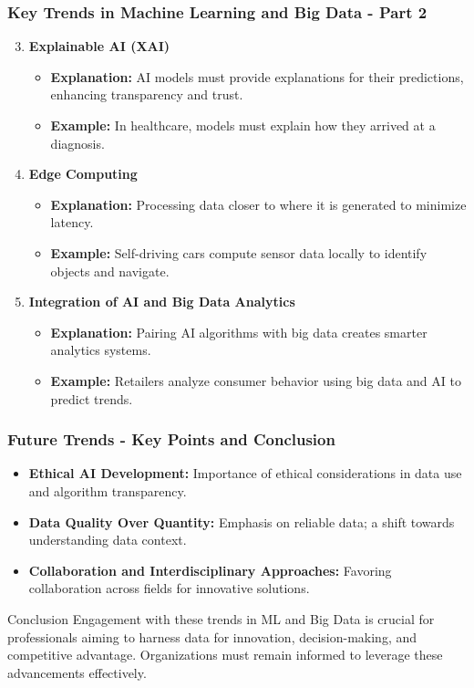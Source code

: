 \documentclass[aspectratio=169]{beamer}
\begin{document}
\begin{frame}[fragile]
    \frametitle{Key Trends in Machine Learning and Big Data - Part 2}
    \begin{enumerate}
        \setcounter{enumi}{2}
        \item \textbf{Explainable AI (XAI)}
            \begin{itemize}
                \item \textbf{Explanation:} AI models must provide explanations for their predictions, enhancing transparency and trust.
                \item \textbf{Example:} In healthcare, models must explain how they arrived at a diagnosis.
            \end{itemize}
        
        \item \textbf{Edge Computing}
            \begin{itemize}
                \item \textbf{Explanation:} Processing data closer to where it is generated to minimize latency.
                \item \textbf{Example:} Self-driving cars compute sensor data locally to identify objects and navigate.
            \end{itemize}

        \item \textbf{Integration of AI and Big Data Analytics}
            \begin{itemize}
                \item \textbf{Explanation:} Pairing AI algorithms with big data creates smarter analytics systems.
                \item \textbf{Example:} Retailers analyze consumer behavior using big data and AI to predict trends.
            \end{itemize}
    \end{enumerate}
\end{frame}

\begin{frame}[fragile]
    \frametitle{Future Trends - Key Points and Conclusion}
    \begin{itemize}
        \item \textbf{Ethical AI Development:} Importance of ethical considerations in data use and algorithm transparency.
        \item \textbf{Data Quality Over Quantity:} Emphasis on reliable data; a shift towards understanding data context.
        \item \textbf{Collaboration and Interdisciplinary Approaches:} Favoring collaboration across fields for innovative solutions.
    \end{itemize}
    
    \begin{block}{Conclusion}
        Engagement with these trends in ML and Big Data is crucial for professionals aiming to harness data for innovation, decision-making, and competitive advantage. Organizations must remain informed to leverage these advancements effectively.
    \end{block}
\end{frame}
\end{document}
